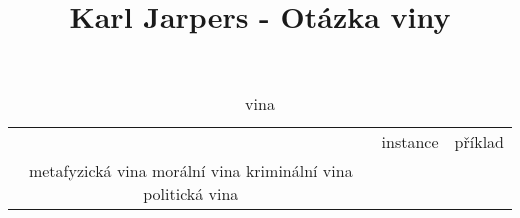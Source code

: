 \documentclass{article}
\title{Karl Jarpers - Otázka viny}
\begin{document}
\maketitle

\begin{table}
\caption{vina}
\centering
  \begin{tabular}{c | c | c }

    & instance & příklad \\
    metafyzická vina
     morální vina
     kriminální vina
     politická vina
  
  \end{tabular}
\end{table}
\end{document}
